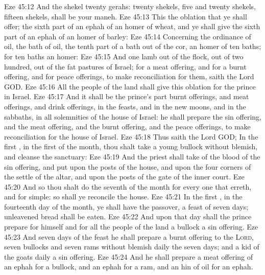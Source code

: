 \vs Eze 45:12 And the shekel  twenty gerahs: twenty shekels, five and twenty shekels, fifteen shekels, shall be your maneh.
\vs Eze 45:13 This  the oblation that ye shall offer; the sixth part of an ephah of an homer of wheat, and ye shall give the sixth part of an ephah of an homer of barley:
\vs Eze 45:14 Concerning the ordinance of oil, the bath of oil,  the tenth part of a bath out of the cor,  an homer of ten baths; for ten baths  an homer:
\vs Eze 45:15 And one lamb out of the flock, out of two hundred, out of the fat pastures of Israel; for a meat offering, and for a burnt offering, and for peace offerings, to make reconciliation for them, saith the Lord GOD.
\vs Eze 45:16 All the people of the land shall give this oblation for the prince in Israel.
\vs Eze 45:17 And it shall be the prince's part  burnt offerings, and meat offerings, and drink offerings, in the feasts, and in the new moons, and in the sabbaths, in all solemnities of the house of Israel: he shall prepare the sin offering, and the meat offering, and the burnt offering, and the peace offerings, to make reconciliation for the house of Israel.
\vs Eze 45:18 Thus saith the Lord GOD; In the first , in the first  of the month, thou shalt take a young bullock without blemish, and cleanse the sanctuary:
\vs Eze 45:19 And the priest shall take of the blood of the sin offering, and put  upon the posts of the house, and upon the four corners of the settle of the altar, and upon the posts of the gate of the inner court.
\vs Eze 45:20 And so thou shalt do the seventh  of the month for every one that erreth, and for  simple: so shall ye reconcile the house.
\vs Eze 45:21 In the first , in the fourteenth day of the month, ye shall have the passover, a feast of seven days; unleavened bread shall be eaten.
\vs Eze 45:22 And upon that day shall the prince prepare for himself and for all the people of the land a bullock  a sin offering.
\vs Eze 45:23 And seven days of the feast he shall prepare a burnt offering to the \textsc{Lord}, seven bullocks and seven rams without blemish daily the seven days; and a kid of the goats daily  a sin offering.
\vs Eze 45:24 And he shall prepare a meat offering of an ephah for a bullock, and an ephah for a ram, and an hin of oil for an ephah.
